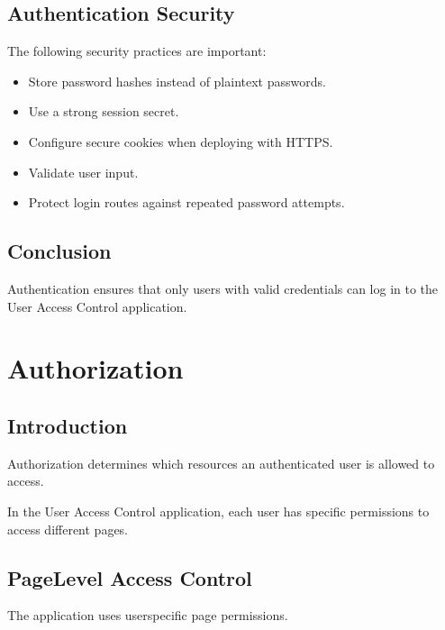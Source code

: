 \documentclass[letterpaper,10pt,english]{sphinxmanual}
\begin{document}
\subsection{Authentication Security}
\label{\detokenize{authentication:authentication-security}}
\sphinxAtStartPar
The following security practices are important:
\begin{itemize}
\item {} 
\sphinxAtStartPar
Store password hashes instead of plain\sphinxhyphen{}text passwords.

\item {} 
\sphinxAtStartPar
Use a strong session secret.

\item {} 
\sphinxAtStartPar
Configure secure cookies when deploying with HTTPS.

\item {} 
\sphinxAtStartPar
Validate user input.

\item {} 
\sphinxAtStartPar
Protect login routes against repeated password attempts.

\end{itemize}


\subsection{Conclusion}
\label{\detokenize{authentication:conclusion}}
\sphinxAtStartPar
Authentication ensures that only users with valid credentials can log in
to the User Access Control application.

\sphinxstepscope


\section{Authorization}
\label{\detokenize{authorization:authorization}}\label{\detokenize{authorization::doc}}

\subsection{Introduction}
\label{\detokenize{authorization:introduction}}
\sphinxAtStartPar
Authorization determines which resources an authenticated user is allowed
to access.

\sphinxAtStartPar
In the User Access Control application, each user has specific permissions
to access different pages.


\subsection{Page\sphinxhyphen{}Level Access Control}
\label{\detokenize{authorization:page-level-access-control}}
\sphinxAtStartPar
The application uses user\sphinxhyphen{}specific page permissions.
\end{document}
